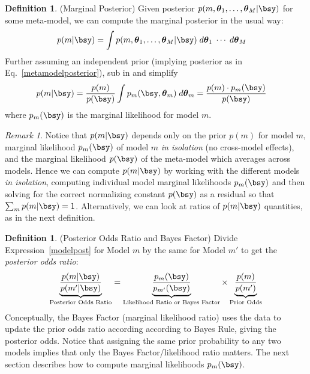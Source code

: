\documentclass[12pt]{article}
\theoremstyle{plain}
\theoremstyle{definition}
\newtheorem{defn}[thm]{Definition}
\theoremstyle{remark}
\newtheorem*{rmk}{Remark}
\newcommand{\bstheta}{\boldsymbol{\theta}}
\begin{document}
\begin{defn}(Marginal Posterior)
Given posterior $p(m,\bstheta_1,\ldots,\bstheta_M|\bsy)$ for some
meta-model, we can compute the marginal posterior in the usual way:
\begin{align*}
  p(m|\bsy)
  &= \int p(m,\bstheta_1,\ldots,\bstheta_M|\bsy)
  \; d\bstheta_1 \;\cdots \; d\bstheta_M
\end{align*}
Further assuming an independent prior (implying posterior as in
Eq.~\ref{metamodelposterior}), sub in and simplify
\begin{align}
  p(m|\bsy)
  &=
  \frac{p(m)}{p(\bsy)}
  \int
  p_m(\bsy,\bstheta_m) \; d\bstheta_m
  =
  \frac{p(m)\cdot p_m(\bsy)}{p(\bsy)}
  \label{modelpost}
\end{align}
where $p_m(\bsy)$ is the marginal likelihood for model $m$.
\end{defn}
\begin{rmk}
Notice that $p(m|\bsy)$ depends only on
the prior $p(m)$ for model $m$, marginal likelihood $p_m(\bsy)$ of
model $m$ \emph{in isolation} (no cross-model effects), and the marginal
likelihood $p(\bsy)$ of the meta-model which averages across models.
Hence we can compute $p(m|\bsy)$ by working with the different
models \emph{in isolation}, computing individual model marginal
likelihoods $p_m(\bsy)$ and then solving for the correct normalizing
constant $p(\bsy)$ as a residual so that $\sum_m p(m|\bsy)=1$.
Alternatively, we can look at ratios of $p(m|\bsy)$ quantities, as in
the next definition.
\end{rmk}



\begin{defn}(Posterior Odds Ratio and Bayes Factor)
Divide Expression~\ref{modelpost} for Model $m$ by the same for Model
$m'$ to get the \emph{posterior odds ratio}:
\begin{align*}
  \underbrace{%
    \frac{p(m|\bsy)}{p(m'|\bsy)}
  }_{\text{Posterior Odds Ratio}}
  =
  \underbrace{%
    \frac{p_m(\bsy)}{p_{m'}(\bsy)}
  }_{\text{Likelihood Ratio or Bayes Factor}}
  \times
  \underbrace{%
    \frac{p(m)}{p(m')}
  }_{\text{Prior Odds}}
\end{align*}
Conceptually, the Bayes Factor (marginal likelihood ratio) uses the data
to update the prior odds ratio according according to Bayes Rule, giving
the posterior odds.
Notice that assigning the same prior probability to any two models
implies that only the Bayes Factor/likelihood ratio matters.
The next section describes how to compute marginal likelihoods
$p_m(\bsy)$.
\end{defn}
\end{document}
